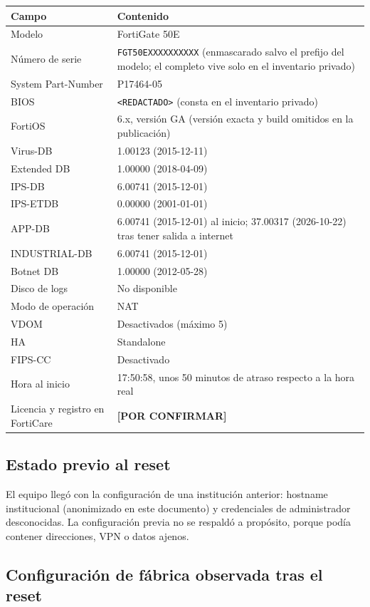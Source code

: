 \documentclass[11pt,a4paper]{article}
\newcommand{\pc}{\textcolor{warning}{\textbf{[POR CONFIRMAR]}}}
\begin{document}
{\small\noindent
\begin{tabularx}{\linewidth}{@{}P{4.2cm}Y@{}}
\toprule
{}\textbf{Campo} & \textbf{Contenido}\\\midrule
Modelo & FortiGate 50E \\
Número de serie & \texttt{FGT50EXXXXXXXXXX} (enmascarado salvo el prefijo del modelo; el completo vive solo en el inventario privado) \\
System Part-Number & P17464-05 \\
BIOS & \texttt{<REDACTADO>} (consta en el inventario privado) \\
FortiOS & 6.x, versión GA (versión exacta y build omitidos en la publicación) \\
Virus-DB & 1.00123 (2015-12-11) \\
Extended DB & 1.00000 (2018-04-09) \\
IPS-DB & 6.00741 (2015-12-01) \\
IPS-ETDB & 0.00000 (2001-01-01) \\
APP-DB & 6.00741 (2015-12-01) al inicio; 37.00317 (2026-10-22) tras tener salida a internet \\
INDUSTRIAL-DB & 6.00741 (2015-12-01) \\
Botnet DB & 1.00000 (2012-05-28) \\
Disco de logs & No disponible \\
Modo de operación & NAT \\
VDOM & Desactivados (máximo 5) \\
HA & Standalone \\
FIPS-CC & Desactivado \\
Hora al inicio & 17:50:58, unos 50 minutos de atraso respecto a la hora real \\
Licencia y registro en FortiCare & \pc \\
\bottomrule
\end{tabularx}\par}

\subsection{Estado previo al reset}

El equipo llegó con la configuración de una institución anterior: hostname institucional (anonimizado en este documento) y credenciales de administrador desconocidas. La configuración previa no se respaldó a propósito, porque podía contener direcciones, VPN o datos ajenos.

\subsection{Configuración de fábrica observada tras el reset}
\end{document}
